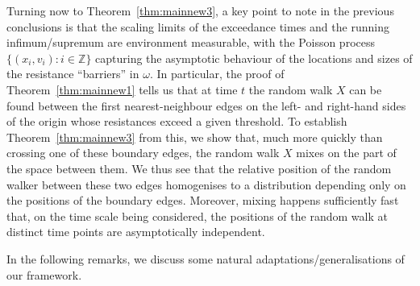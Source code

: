 \documentclass[10pt]{amsart}
\theoremstyle{definition}\newtheorem{defi}[theo]{Definition}\newtheorem{rema}[theo]{Remark}\newtheorem{exam}[theo]{Example}\newtheorem{exem}[theo]{Example}\newtheorem{nota}[theo]{Notation}
\newcommand{\Z}{\mathbb Z}
\begin{document}
Turning now to Theorem~\ref{thm:mainnew3}, a key point to note in the previous conclusions is that the scaling limits of the exceedance times and the running infimum/supremum are environment measurable, with the Poisson process $\{(x_i,v_i):i\in\Z\}$ capturing the asymptotic behaviour of the locations and sizes of the resistance ``barriers'' in $\omega$. In particular, the proof of Theorem~\ref{thm:mainnew1} tells us that at time $t$ the random walk $X$ can be found between the first nearest-neighbour edges on the left- and right-hand sides of the origin whose resistances exceed a given threshold. To establish Theorem~\ref{thm:mainnew3} from this, we show that, much more quickly than crossing one of these boundary edges, the random walk $X$ mixes on the part of the space between them. We thus see that the relative position of the random walker between these two edges homogenises to a distribution depending only on the positions of the boundary edges. Moreover, mixing happens sufficiently fast that, on the time scale being considered, the positions of the random walk at distinct time points are asymptotically independent.

In the following remarks, we discuss some natural adaptations/generalisations of our framework.
\end{document}
